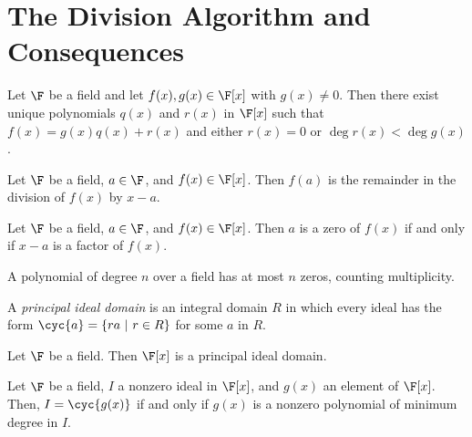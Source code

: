 \section{The Division Algorithm and Consequences}

\begin{theorem}
	Let $\F$ be a field and let $f(x), g(x) \in \F[x]$ with $g(x) \neq 0$. Then there exist unique polynomials $q(x)$ and $r(x)$ in $\F[x]$ such that $f(x) = g(x)q(x) + r(x)$ and either $r(x) = 0$ or $\deg r(x) < \deg g(x)$.
\end{theorem}

\begin{corollary}
	Let $\F$ be a field, $a \in \F$, and $f(x) \in \F[x]$. Then $f(a)$ is the remainder in the division of $f(x)$ by $x -a$.
\end{corollary}

\begin{corollary}
	Let $\F$ be a field, $a \in \F$, and $f(x) \in \F[x]$. Then $a$ is a zero of $f(x)$ if and only if $x-a$ is a factor of $f(x)$.
\end{corollary}

\begin{corollary}
	A polynomial of degree $n$ over a field has at most $n$ zeros, counting multiplicity.
\end{corollary}

\begin{definition}
	A \textit{principal ideal domain} is an integral domain $R$ in which every ideal has the form $\cyc{a}=\{ra\ \vert\ r \in R\}$ for some $a$ in $R$.
\end{definition}

\begin{theorem}
	Let $\F$ be a field. Then $\F[x]$ is a principal ideal domain.
\end{theorem}

\begin{theorem}[Criterion for $\mathbf{I = \cyc{g(x)}}$]
	Let $\F$ be a field, $I$ a nonzero ideal in $\F[x]$, and $g(x)$ an element of $\F[x]$. Then, $I=\cyc{g(x)}$ if and only if $g(x)$ is a nonzero polynomial of minimum degree in $I$.
\end{theorem}
